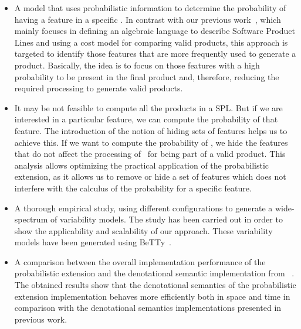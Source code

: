\begin{itemize}

        \item
        A model that uses probabilistic information to determine the probability of having a feature in a specific \SPL. In contrast with our previous work~\cite{acl13,clc16}, which mainly focuses in defining an algebraic language to describe Software Product Lines and using a cost model for comparing valid products, this approach is targeted to identify those features that are more frequently used to generate a product. Basically, the idea is to focus on those features with a high probability to be present in the final product and, therefore, reducing the required processing to generate valid products.

      \item It may be not feasible to compute all the products in a
        SPL. But if we are interested in a particular feature, we can
        compute the probability of that feature.  The introduction of
        the notion of hiding sets of features helps us to achieve
        this. If we want to compute the probability of \fA, we hide
        the features that do not affect the processing of \fA\ for
        being part of a valid product.  This analysis allows
        optimizing the practical application of the probabilistic
        extension, as it allows us to remove or hide a set of features
        which does not interfere with the calculus of the probability
        for a specific feature.

        \item
        A thorough empirical study, using different configurations to generate a wide-spectrum of variability models. The  study has been carried out in order to show the applicability and scalability of our approach. These variability models have been generated using BeTTy~\cite{sg12}.

        \item
        A comparison between the overall implementation performance of the probabilistic extension and the denotational semantic implementation from \fodaPA~\cite{acl13}. The obtained results show that the denotational semantics of the probabilistic extension implementation behaves more efficiently both in space and time
        in comparison with the denotational semantics implementations presented in previous work.

\end{itemize}


